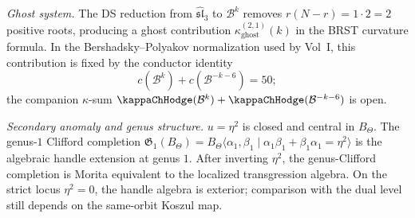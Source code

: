 \begin{computation}
\emph{Ghost system.}
The DS reduction from $\widehat{\mathfrak{sl}}_3$ to
$\mathcal B^k$ removes $r(N{-}r)=1\cdot 2=2$ positive roots,
producing a ghost contribution
\(\kappa_{\mathrm{ghost}}^{(2,1)}(k)\) in the BRST curvature
formula.  In the Bershadsky--Polyakov normalization used by Vol~I,
this contribution is fixed by the conductor identity
\[
c(\mathcal B^k)+c(\mathcal B^{-k-6})=50;
\]
the companion $\kappa$-sum
$\kappaChHodge(\mathcal B^k)+\kappaChHodge(\mathcal B^{-k-6})$ is
open.

\emph{Secondary anomaly and genus structure.}
$u=\eta^2$ is closed and central in $B_\Theta$. The
genus-$1$ Clifford completion
$\mathfrak G_1(B_\Theta)=B_\Theta\langle\alpha_1,\beta_1
\mid\alpha_1\beta_1+\beta_1\alpha_1=\eta^2\rangle$
is the algebraic handle extension at genus \(1\). After inverting
\(\eta^2\), the genus-Clifford completion is Morita equivalent to
the localized transgression algebra. On the strict locus
\(\eta^2=0\), the handle algebra is exterior; comparison with the
dual level still depends on the same-orbit Koszul map.
\end{computation}

